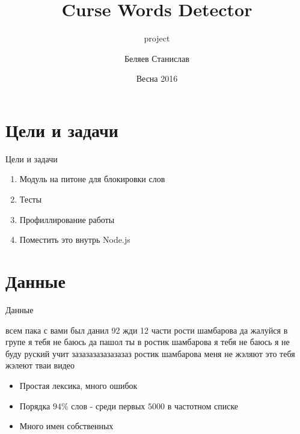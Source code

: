 \documentclass{beamer}
\title{Curse Words Detector}
\subtitle{project}
\author{Беляев Станислав}
\institute{СПб АУ РАН}
\date{Весна 2016}
\begin{document}
\frame{\titlepage}

\section{Цели и задачи}
\begin{frame}[<+->]{Цели и задачи}
    \begin{enumerate}
        \item Модуль на питоне для блокировки слов
        \item Тесты
        \item Профиллирование работы
        \item Поместить это внутрь Node.js
    \end{enumerate}
\end{frame}

\section{Данные}
\begin{frame}{Данные}
    \begin{tcolorbox}[colback=blue!5,colframe=blue!40!black,title=Реальный пример текста]
        всем пака с вами был данил 92 жди 12 части
        рости шамбарова да жалуйся в групе я тебя не баюсь да пашол ты в ростик шамбарова
        я тебя не баюсь я не буду руский учит зазазазазазазазаз
        ростик шамбарова меня не жэляют это тебя жэлеют тваи видео
    \end{tcolorbox}
    \begin{itemize}
        \item Простая лексика, много ошибок
        \item Порядка $94\%$ слов - среди первых $5000$ в частотном списке
        \item Много имен собственных
    \end{itemize}
\end{frame}
\end{document}
